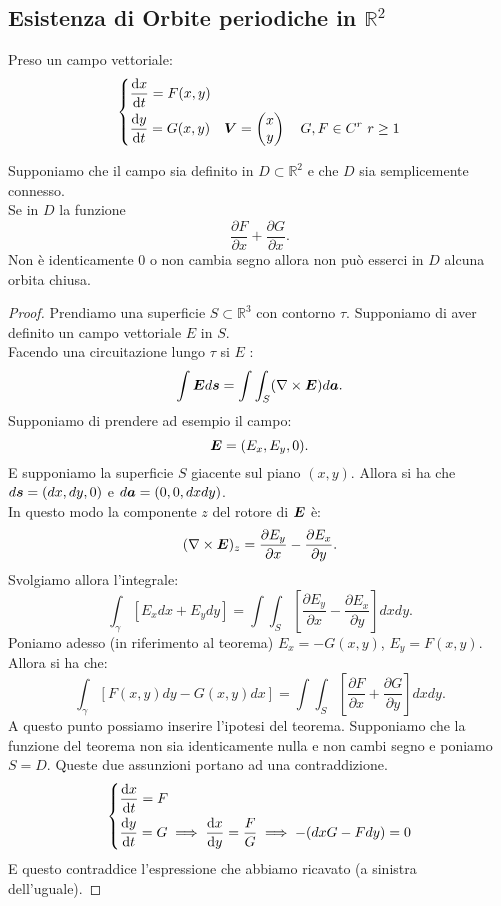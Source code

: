 \subsection{Esistenza di Orbite periodiche in $\mathbb{R}^2$}%
\label{sub:Esistenza di Orbite periodiche in} 
Preso un campo vettoriale:
\[
\begin{dcases}
    \frac{\text{d} x}{\text{d} t} = F(x, y) \\
    \frac{\text{d} y}{\text{d} t} = G(x, y) 
    \quad  \boldsymbol{V} = \begin{pmatrix} x \\ y \end{pmatrix} \quad 
    G, F \in C^r \ r\ge 1
\end{dcases}
\]
\begin{thm}
    Supponiamo che il campo sia definito in $D \subset \mathbb{R}^2$  e che $D$  sia semplicemente connesso.\\
    Se in $D$  la funzione 
    \[
        \frac{\partial F}{\partial x} + \frac{\partial G}{\partial x} 
    .\] Non è identicamente $0$ o non cambia segno allora non può esserci in $D$ alcuna orbita chiusa.
\end{thm}
\noindent
\begin{proof}
    Prendiamo una superficie $S \subset \mathbb{R}^3$ con contorno $\tau$. Supponiamo di aver definito un campo vettoriale $E$ in $S$.\\
    Facendo una circuitazione lungo $\tau$ si $E$ :
    \[
	\int \boldsymbol{E}d\boldsymbol{s} = \int \int_S (\nabla \times \boldsymbol{E}) d\boldsymbol{a}
    .\] 
    Supponiamo di prendere ad esempio il campo:
    \[
	\boldsymbol{E} = (E_x, E_y, 0)
    .\] 
    E supponiamo la superficie $S$ giacente sul piano $(x, y)$. Allora si ha che $d\boldsymbol{s} = (dx, dy, 0) $ e $d\boldsymbol{a} = (0 , 0, dxdy) $.\\
    In questo modo la componente $z$ del rotore di $\boldsymbol{E}$ è:
    \[
	(\nabla \times \boldsymbol{E})_z = \frac{\partial E_y}{\partial x} - \frac{\partial E_x}{\partial y} 
    .\] 
    Svolgiamo allora l'integrale:
    \[
        \int_\gamma  \left[E_x dx + E_ydy\right] = \int \int_S \left[\frac{\partial E_y}{\partial x} - \frac{\partial E_x}{\partial y} \right]dxdy
    .\] 
    Poniamo adesso (in riferimento al teorema) $E_x = -G(x, y)$, $E_y = F(x, y) $. Allora si ha che:
    \[
	\int_\gamma  \left[F(x, y) dy - G(x, y) dx\right] = 
	\int \int_S \left[\frac{\partial F}{\partial x} + \frac{\partial G}{\partial y} \right]dxdy
    .\] 
    A questo punto possiamo inserire l'ipotesi del teorema. Supponiamo che la funzione del teorema non sia identicamente nulla e non cambi segno e poniamo $S = D$. Queste due assunzioni portano ad una contraddizione.
    \[
    \begin{dcases}
    \frac{\text{d} x}{\text{d} t} = F\\
    \frac{\text{d} y}{\text{d} t} = G 
    \implies  \frac{\text{d} x}{\text{d} y} = \frac{F}{G}\implies 
    -(dxG-Fdy) = 0
    \end{dcases}
    \]
    E questo contraddice l'espressione che abbiamo ricavato (a sinistra dell'uguale).
\end{proof}
